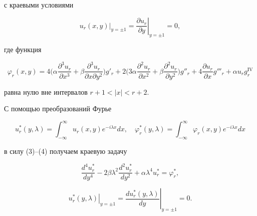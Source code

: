 с краевыми условиями 


\begin{equation} 


\left. u_r(x,y)\right|_{y=\pm 1}= 


\left. \frac{\partial u_r}{\partial y}\right|_{y=\pm 1}=0, 


\end{equation} 


где функция 


$$ 


\varphi_r(x,y)= 


4\biggl(\alpha \frac{\partial^3u_r}{\partial x^3} 


+\beta \frac{\partial^3u_r}{\partial x \partial y^2}\biggr)g'_r 


+2\biggl(3\alpha \frac{\partial^2u_r}{\partial x^2}+ 


\beta\frac{\partial^2u_r}{\partial y^2}\biggr)g''_r 


+4 \frac{\partial u_r}{\partial x}g'''_r+ 


\alpha u_r g^{\mathrm{IV}}_r 


$$ 


равна нулю вне интервалов $r+1<|x|<r+2$. 


 


С помощью преобразований Фурье 


$$ 


u^*_r(y,\lambda)=\int^\infty_{-\infty}u_r(x,y) 


e^{-i\lambda x}dx,\quad 


\varphi^*_r(y,\lambda)=\int^\infty_{-\infty}\varphi_r(x,y) 


e^{-i\lambda x}dx 


$$ 


в силу (3)--(4) получаем краевую задачу 


\begin{equation} 


\frac{d^4u_r^*}{d y^4} 


-2\beta\lambda^2\frac{d^2u_r^*}{d y^2} 


+\alpha\lambda^4u^*_r=\varphi^*_r, 


\end{equation} 


%


\begin{equation} 


\left. u^*_r(y,\lambda)\right|_{y=\pm 1} 


=\left. \frac{d u^*_r(y,\lambda)}{d y}\right|_{y=\pm 1}=0. 


\end{equation} 



